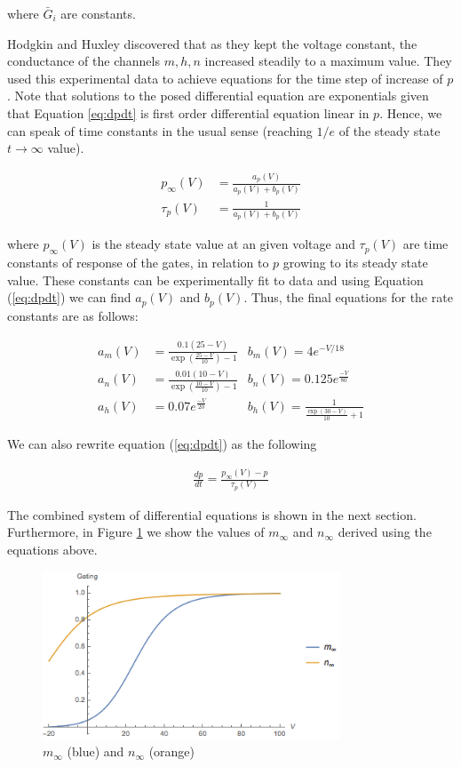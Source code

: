 \documentclass[12]{book}
\newcommand\0{\mathbf{0}}
\newcommand\<{\langle}
\renewcommand\>{\rangle}
\begin{document}
where $\bar{G}_i$ are constants.

Hodgkin and Huxley discovered that as they kept the voltage constant, the conductance of the channels $m, h, n$ increased steadily to a maximum value. They used this experimental data to achieve equations for the time step of increase of $p$. Note that solutions to the posed differential equation are exponentials given that Equation \ref{eq:dpdt} is first order differential equation linear in $p$. Hence, we can speak of time constants in the usual sense (reaching $1/e$ of the steady state $t \rightarrow \infty$ value).

\begin{align}
    p_{\infty}(V) &= \frac{a_p(V)}{a_p(V) + b_p(V)} \\
    \tau_p(V) &= \frac{1}{a_p(V) + b_p(V)} 
    \label{eq:time}
\end{align}

where $p_{\infty}(V)$ is the steady state value at an given voltage and ${\tau_p}(V)$ are time constants of response of the gates, in relation to $p$ growing to its steady state value. These constants can be experimentally fit to data and using Equation (\ref{eq:dpdt}) we can find $a_p(V)$ and $b_p(V)$. Thus, the final equations for the rate constants are as follows:

\begin{align*}
    a_m(V) &= \frac{0.1(25-V)}{\exp(\frac{25-V}{10})-1}
    &b_m(V) = 4e^{-V/18} \\
    a_n(V) &= \frac{0.01(10-V)}{\exp(\frac{10-V}{10})-1} 
    &b_n(V) = 0.125e^{\frac{-V}{80}}\\
    a_h(V) &= 0.07e^{\frac{-V}{20}} 
    &b_h(V) = \frac{1}{\frac{\exp(30-V)}{10}+1}
\end{align*}

We can also rewrite equation (\ref{eq:dpdt}) as the following

\begin{align*}
    \frac{dp}{dt} = \frac{p_{\infty}(V)-p}{\tau_p(V)}
\end{align*}

The combined system of differential equations is shown in the next section. Furthermore, in Figure \ref{fig:inf} we show the values of $m_\infty$ and $n_\infty$ derived using the equations above. 

\begin{figure}[h]
\centering
	\includegraphics[height=5cm]{gating.png}
	\caption{$m_{\infty}$ (blue) and $n_{\infty}$ (orange)}
		\label{fig:inf}
\end{figure}
\end{document}
